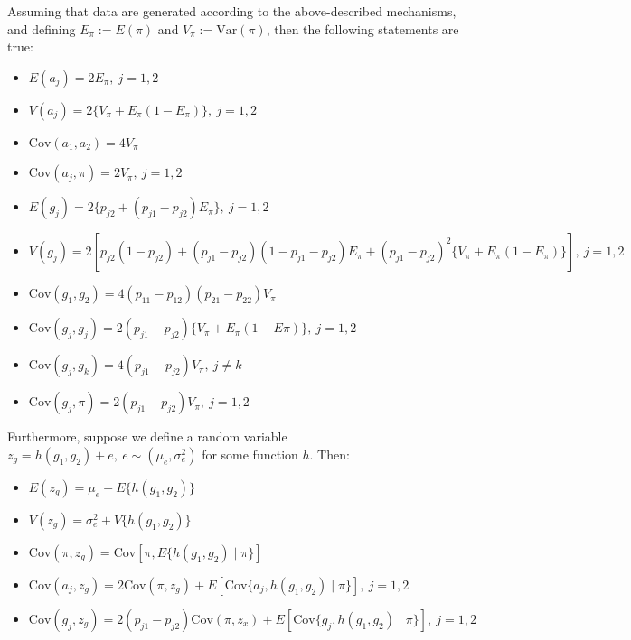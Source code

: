\documentclass[12pt]{article}
\begin{document}
Assuming that data are generated according to the above-described mechanisms, and defining $E_\pi := E(\pi)$ and $V_\pi :=   \text{Var}(\pi)$, then the following statements are true:

\begin{itemize}
\item $E(a_j) = 2E_\pi, \ j = 1, 2$
\item $V(a_j) = 2\{V_\pi + E_\pi(1-E_\pi)\}, \ j = 1, 2$
\item $\text{Cov}(a_1, a_2) = 4V_\pi$
\item $\text{Cov}(a_j, \pi) = 2V_\pi, \ j = 1, 2$
\item $E(g_j) = 2\{p_{j2} + (p_{j1}-p_{j2})E_\pi\}, \ j = 1, 2$
\item $V(g_j) = 2[p_{j2}(1-p_{j2}) + (p_{j1}-p_{j2})(1-p_{j1}-p_{j2})E_\pi + (p_{j1}-p_{j2})^2\{V_\pi + E_\pi(1-E_\pi)\}], \ j = 1, 2$
\item $\text{Cov}(g_1, g_2) = 4(p_{11}-p_{12})(p_{21}-p_{22})V_\pi$
\item $\text{Cov}(g_j, g_j) = 2(p_{j1}-p_{j2})\{V_\pi + E_\pi(1-E\pi)\}, \ j = 1, 2$
\item $\text{Cov}(g_j, g_k) = 4(p_{j1}-p_{j2})V_\pi, \ j \neq k$
\item $\text{Cov}(g_j, \pi) = 2(p_{j1}-p_{j2})V_\pi, \ j = 1, 2$
\end{itemize}

Furthermore, suppose we define a random variable %
$z_g = h(g_1, g_2) + e, \ e \sim (\mu_e, \sigma_e^2)$ for some function $h$. Then:
\begin{itemize}
\item $E(z_g) = \mu_e + E\{h(g_1, g_2)\}$
\item $V(z_g) = \sigma_e^2 + V\{h(g_1, g_2)\}$
\item $\text{Cov}(\pi, z_g) = \text{Cov}[\pi, E\{h(g_1,g_2) \mid \pi\}]$ 
\item  $\text{Cov}(a_j, z_g) = 2\text{Cov}(\pi, z_g) + E[\text{Cov}\{a_j, h(g_1,g_2) \mid \pi\}], \ j = 1, 2$
\item $\text{Cov}(g_j, z_g) = 2(p_{j1}-p_{j2}) \text{Cov}(\pi, z_x) + E[\text{Cov}\{g_j, h(g_1,g_2) \mid \pi\}], \ j = 1,2$
\end{itemize}
\end{document}
